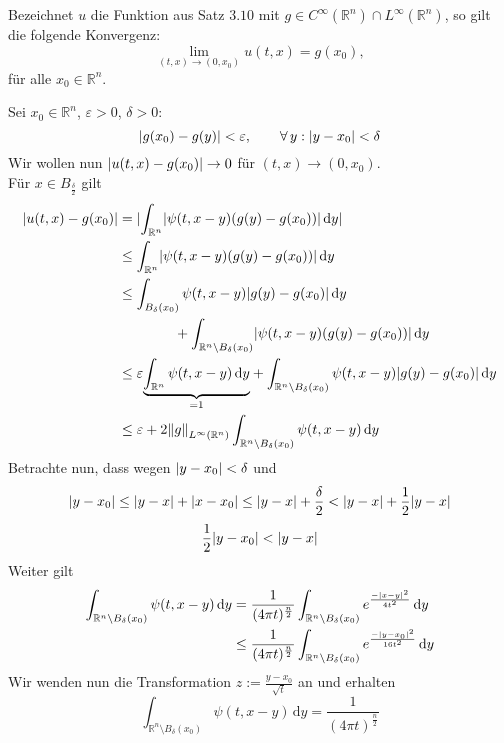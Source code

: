 \begin{satz}
	Bezeichnet $u$ die Funktion aus Satz $3.10$ mit $g \in C^{\infty}(\mathbb{R}^n) \cap L^{\infty}(\mathbb{R}^n)$, so gilt die folgende Konvergenz:
	\[
		\lim_{(t,x) \to (0,x_0)} u(t,x)=g(x_0), 
	\]
	für alle $x_0 \in \mathbb{R}^n$.
\end{satz}
\begin{beweis}
	Sei $x_0 \in \mathbb{R}^n$, $\varepsilon >0$, $\delta >0$:
	\[
		\lvert g(x_0)-g(y)\rvert < \varepsilon, \qquad \forall\, y: \lvert y-x_0\rvert < \delta 
	\]
	Wir wollen nun $\lvert u(t,x)-g(x_0)\rvert \to 0$ für $(t,x) \to (0,x_0)$. \\
	Für $x \in B_{\frac{\delta }{2}}$ gilt
	\begin{align*}
		\abs{u(t,x)-g(x_0)} &= \abs{\int_{\mathbb{R}^n}^{} \abs{\psi(t,x-y)(g(y)-g(x_0))} \,\mathrm{d}y} \\
		&\leq \int_{\mathbb{R}^n}^{} \abs{\psi(t,x-y)(g(y)-g(x_0))} \,\mathrm{d}y \\
		&\leq \int_{B_{\delta}(x_0)}^{} \psi(t,x-y) \abs{g(y)-g(x_0)} \,\mathrm{d}y \\
		& \qquad \qquad + \int_{\mathbb{R}^n \setminus B_{\delta }(x_0)}^{} \abs{ \psi(t,x-y) (g(y)-g(x_0))} \,\mathrm{d}y \\
		& \leq \varepsilon \underset{=1}{\underbrace{\int_{\mathbb{R}^n}^{} \psi(t,x-y) \,\mathrm{d}y}} 
		+ \int_{\mathbb{R}^n \setminus B_{\delta }(x_0)}^{} \psi(t,x-y)\abs{g(y)-g(x_0)} \,\mathrm{d}y \\
		&\leq  \varepsilon + 2 \norm{g}_{L^{\infty}(\mathbb{R}^n)} \int_{\mathbb{R}^n \setminus B_{\delta }(x_0)}^{} \psi(t,x-y) \,\mathrm{d}y
	\end{align*}
	Betrachte nun, dass wegen $\lvert y-x_0\rvert < \delta$ und 
	\[
		\lvert y-x_0\rvert \leq \lvert y-x\rvert + \lvert x-x_0\rvert \leq \lvert y-x\rvert+ \frac{\delta }{2} < \lvert y-x\rvert + \frac{1}{2}\lvert y-x\rvert
	\]
	\[
		\frac{1}{2} \lvert y-x_0\rvert< \lvert y-x\rvert
	\]
	Weiter gilt
	\begin{align*}
		\int_{\mathbb{R}^n \setminus B_{\delta }(x_0)}^{} \psi(t,x-y) \,\mathrm{d}y 
		&= \frac{1}{(4 \pi t)^{\frac{n}{2}}} \int_{\mathbb{R}^n \setminus B_{\delta }(x_0)} e^{\frac{-\lvert x-y\rvert^2}{4t^2}} \,\mathrm{d}y \\
		&\leq \frac{1}{(4 \pi t)^{\frac{n}{2}}} \int_{\mathbb{R}^n \setminus B_{\delta }(x_0)}^{} e^{\frac{-\lvert y-x_0\rvert^2}{16t^2}} \,\mathrm{d}y
	\end{align*}
	Wir wenden nun die Transformation $z:= \frac{y-x_0}{\sqrt{t}}$ an und erhalten
	\[
		\int_{\mathbb{R}^n \setminus B_{\delta }(x_0)}^{} \psi(t,x-y) \,\mathrm{d}y= \frac{1}{(4 \pi t)^{\frac{n}{2}}} 
\]
\end{beweis}
